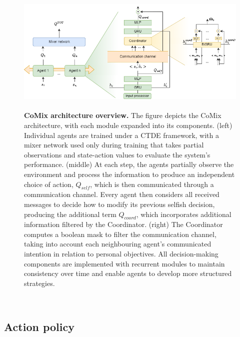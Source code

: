 \documentclass[a4paper,singleside,12pt]{report} %
\begin{document}
\begin{figure}
  \centering
  \hspace*{-0.9cm}
  \includegraphics[height=6cm]{images/pipeline.png}
  \vspace*{4mm}
  \caption{ \textbf{CoMix architecture overview.} The figure depicts the CoMix architecture, with each module expanded into its components. (left) Individual agents are trained under a CTDE framework, with a mixer network used only during training that takes partial observations and state-action values to evaluate the system's performance. (middle) At each step, the agents partially observe the environment and process the information to produce an independent choice of action, $Q_{self}$, which is then communicated through a communication channel. Every agent then considers all received messages to decide how to modify its previous selfish decision, producing the additional term $Q_{coord}$, which incorporates additional information filtered by the Coordinator. (right) The Coordinator computes a boolean mask to filter the communication channel, taking into account each neighbouring agent's communicated intention in relation to personal objectives. All decision-making components are implemented with recurrent modules to maintain consistency over time and enable agents to develop more structured strategies.}
  \label{fig:pipeline}
\end{figure}\

\subsection{Action policy}\label{action-policy}
\end{document}
